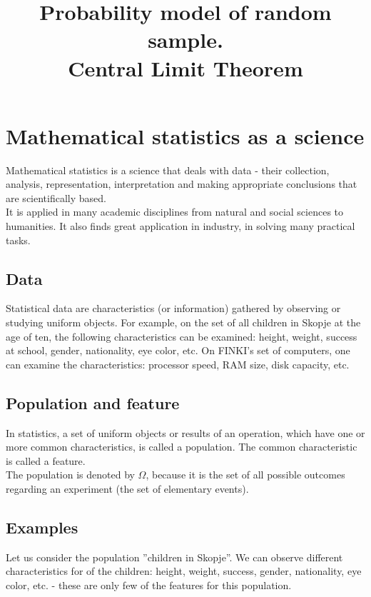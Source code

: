 \documentclass[a4paper, 12pt]{article}
\title{
  \vspace{-1.5cm}
  \textbf{Probability model of random sample.\\ Central Limit Theorem}
  \vspace{-1.5cm}
}
\date{}
\begin{document}
\maketitle


\section{Mathematical statistics as a science}

Mathematical statistics is a science that deals with data - their collection, analysis, representation, interpretation and making appropriate conclusions that are scientifically based.\\

It is applied in many academic disciplines from natural and social sciences to humanities. It also finds great application in industry, in solving many practical tasks.\\

\subsection{Data}

Statistical data are characteristics (or information) gathered by observing or studying uniform objects. For example, on the set of all children in Skopje at the age of ten, the following characteristics can be examined: height, weight, success at school, gender, nationality, eye color, etc. On FINKI's set of computers, one can examine the characteristics: processor speed, RAM size, disk capacity, etc.

\subsection{Population and feature}

In statistics, a set of uniform objects or results of an operation, which have one or more common characteristics, is called a population. The common characteristic is called a feature. \\

The population is denoted by $\Omega$, because it is the set of all possible outcomes regarding an experiment (the set of elementary events).


\subsection{Examples}

Let us consider the population ”children in Skopje”. We can observe different
characteristics for of the children: height, weight, success, gender, nationality, eye
color, etc. - these are only few of the features for this population. \\
\end{document}
